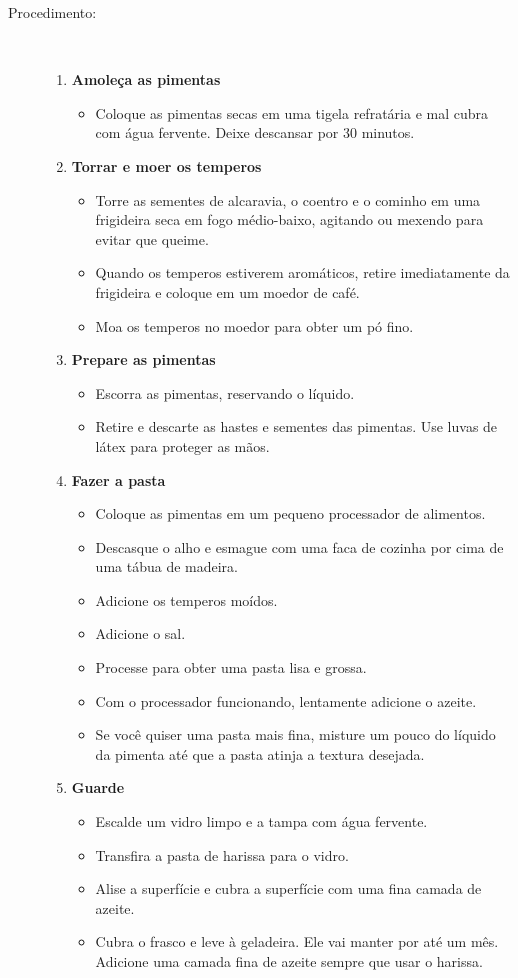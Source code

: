 \documentclass [11pt, papel de carta] {article}
\begin{document}
\begin {description}
\item [Procedimento:] \ \\
\begin {enumerate}
\item {\bf Amoleça as pimentas}
\begin {itemize}
\item Coloque as pimentas secas em uma tigela refratária e mal cubra com água fervente. Deixe descansar por 30 minutos.
\end {itemize}
\item {\bf Torrar e moer os temperos}
\begin {itemize}
\item Torre as sementes de alcaravia, o coentro e o cominho em uma frigideira seca em fogo médio-baixo, agitando ou mexendo para evitar que queime.
\item Quando os temperos estiverem aromáticos, retire imediatamente da frigideira e coloque em um moedor de café.
\item Moa os temperos no moedor para obter um pó fino.
\end {itemize}
\item {\bf Prepare as pimentas}
\begin {itemize}
\item Escorra as pimentas, reservando o líquido.
\item Retire e descarte as hastes e sementes das pimentas. Use luvas de látex para proteger as mãos.
\end {itemize}
\item {\bf Fazer a pasta}
\begin {itemize}
\item Coloque as pimentas em um pequeno processador de alimentos.
\item Descasque o alho e esmague com uma faca de cozinha por cima de uma tábua de madeira.
\item Adicione os temperos moídos.
\item Adicione o sal.
\item Processe para obter uma pasta lisa e grossa.
\item Com o processador funcionando, lentamente adicione o azeite.
\item Se você quiser uma pasta mais fina, misture um pouco do líquido da pimenta até que a pasta atinja a textura desejada.
\end {itemize}
\item {\bf Guarde}
\begin {itemize}
\item Escalde um vidro limpo e a tampa com água fervente.
\item Transfira a pasta de harissa para o vidro.
\item Alise a superfície e cubra a superfície com uma fina camada de azeite.
\item Cubra o frasco e leve à geladeira. Ele vai manter por até um mês. Adicione uma camada fina de azeite sempre que usar o harissa.
\end {itemize}
\end {enumerate}
\end {description}
\end{document}
